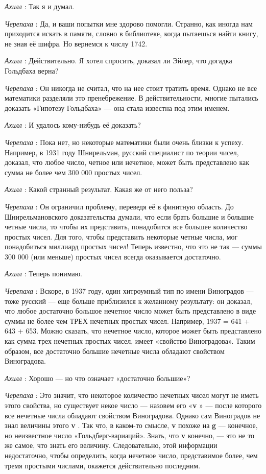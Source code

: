 \documentclass[../main.tex]{subfiles}
\begin{document}
\begin{dialogue}
\emph{Ахилл} : Так я и думал.

\emph{Черепаха} : Да, и ваши попытки мне здорово помогли. Странно, как иногда нам приходится искать в памяти, словно в библиотеке, когда пытаешься найти книгу, не зная её шифра. Но вернемся к числу 1742.

\emph{Ахилл} : Действительно. Я хотел спросить, доказал ли Эйлер, что догадка Гольдбаха верна?

\emph{Черепаха} : Он никогда не считал, что на нее стоит тратить время. Однако не все математики разделяли это пренебрежение. В действительности, многие пытались доказать «Гипотезу Гольдбаха» --- она стала известна под этим именем.

\emph{Ахилл} : И удалось кому-нибудь её доказать?

\emph{Черепаха} : Пока нет, но некоторые математики были очень близки к успеху. Например, в 1931 году Шнирельман, русский специалист по теории чисел, доказал, что любое число, четное или нечетное, может быть представлено как сумма не более чем 300 000 простых чисел.

\emph{Ахилл} : Какой странный результат. Какая же от него польза?

\emph{Черепаха} : Он ограничил проблему, переведя её в финитную область. До Шнирельмановского доказательства думали, что если брать большие и большие четные числа, то чтобы их представить, понадобится все большее количество простых чисел. Для того, чтобы представить некоторые четные числа, мог понадобиться миллиард простых чисел! Теперь известно, что это не так --- суммы 300 000 (или меньше) простых чисел всегда оказывается достаточно.

\emph{Ахилл} : Теперь понимаю.

\emph{Черепаха} : Вскоре, в 1937 году, один хитроумный тип по имени Виноградов --- тоже русский --- еще больше приблизился к желанному результату: он доказал, что любое достаточно большое нечетное число может быть представлено в виде суммы не более чем ТРЕХ нечетных простых чисел. Например, 1937 = 641 + 643 + 653. Можно сказать, что нечетное число, которое может быть представлено как сумма трех нечетных простых чисел, имеет «свойство Виноградова». Таким образом, все достаточно большие нечетные числа обладают свойством Виноградова.

\emph{Ахилл} : Хорошо --- но что означает «достаточно большие»?

\emph{Черепаха} : Это значит, что некоторое количество нечетных чисел могут не иметь этого свойства, но существует некое число --- назовем его «\textbf{v} » --- после которого все нечетные числа обладают свойством Виноградова. Однако сам Виноградов не знал величины этого \textbf{v} . Так что, в каком-то смысле, \textbf{v} похоже на \textbf{g} --- конечное, но неизвестное число «Гольдберг-вариаций». Знать, что \textbf{v} конечно, --- это не то же самое, что знать его величину. Следовательно, этой информации недостаточно, чтобы определить, когда нечетное число, представимое более, чем тремя простыми числами, окажется действительно последним.


\end{dialogue}
\end{document}
